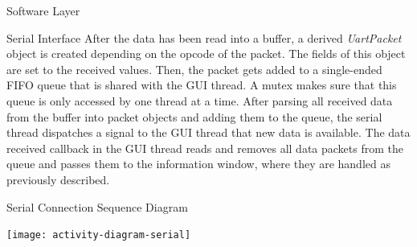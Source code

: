 \documentclass{matthijs}
\begin{document}
\begin{hoofdstuk}{Software Layer}
\begin{paragraaf}{Serial Interface}
			After the data has been read into a buffer, a derived \textit{UartPacket} object is created depending on the opcode of the packet.
			The fields of this object are set to the received values.
			Then, the packet gets added to a single-ended FIFO queue that is shared with the GUI thread.
			A mutex makes sure that this queue is only accessed by one thread at a time.
			After parsing all received data from the buffer into packet objects and adding them to the queue, the serial thread dispatches a signal to the GUI thread that new data is available.
			The data received callback in the GUI thread reads and removes all data packets from the queue and passes them to the information window, where they are handled as previously described.

			\clearpage

			\begin{figuur}{Serial Connection Sequence Diagram}
				\vspace{-5ex}
				\singlespacing
				\centerline{
					\texttt{[image: activity-diagram-serial]}
				}
				\onehalfspacing
			\end{figuur}
		\end{paragraaf}

	\end{hoofdstuk}
\end{document}
